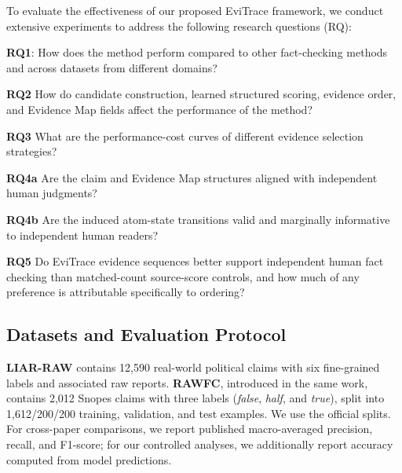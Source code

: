 \documentclass[letterpaper]{article}
\begin{document}
To evaluate the effectiveness of our proposed EviTrace framework, we conduct extensive experiments to address the following research questions (RQ): 

\textbf{RQ1}: How does the method perform compared to other fact-checking methods and across datasets from different domains?

\textbf{RQ2} How do candidate construction, learned structured scoring, evidence order, and Evidence Map fields affect the performance of the method?

\textbf{RQ3} What are the performance-cost curves of different evidence selection strategies?

\textbf{RQ4a} Are the claim and Evidence Map structures aligned with
independent human judgments?

\textbf{RQ4b} Are the induced atom-state transitions valid and
marginally informative to independent human readers?

\textbf{RQ5} Do EviTrace evidence sequences better support independent
human fact checking than matched-count source-score controls, and how
much of any preference is attributable specifically to ordering?

\subsection{Datasets and Evaluation Protocol}

\textbf{LIAR-RAW} \citep{Yang2022CofCED} contains
12,590 real-world political claims with six fine-grained
labels and associated raw reports.
\textbf{RAWFC}, introduced in the same work, contains
2,012 Snopes claims with three labels
(\textit{false}, \textit{half}, and \textit{true}), split into
1,612/200/200 training, validation, and test examples.
We use the official splits. For cross-paper comparisons,
we report published macro-averaged precision, recall, and
F1-score; for our controlled analyses, we additionally
report accuracy computed from model predictions.
\end{document}
